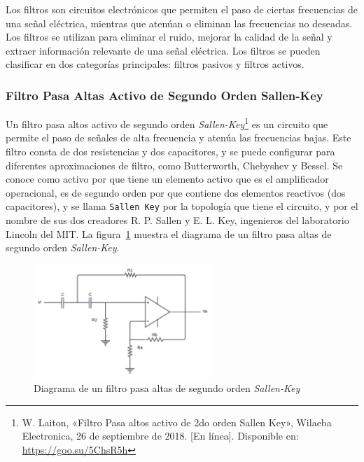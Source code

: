         Los filtros son circuitos electrónicos que permiten el paso de ciertas frecuencias de una señal eléctrica, mientras que atenúan o eliminan las frecuencias no deseadas. Los filtros se utilizan para eliminar el ruido, mejorar la calidad de la señal y extraer información relevante de una señal eléctrica. Los filtros se pueden clasificar en dos categorías principales: filtros pasivos y filtros activos.

        \subsubsection{Filtro Pasa Altas Activo de Segundo Orden Sallen-Key}

            Un filtro pasa altos activo de segundo orden \textit{Sallen-Key}\footnote{W. Laiton, «Filtro Pasa altos activo de 2do orden Sallen Key», Wilaeba Electronica, 26 de septiembre de 2018. [En línea]. Disponible en: \url{https://goo.su/5ChsR5h}} es un circuito que permite el paso de señales de alta frecuencia y atenúa las frecuencias bajas. Este filtro consta de dos resistencias y dos capacitores, y se puede configurar para diferentes aproximaciones de filtro, como Butterworth, Chebyshev y Bessel. Se conoce como activo por que tiene un elemento activo que es el amplificador operacional, es de segundo orden por que contiene dos elementos reactivos (dos capacitores), y se llama \texttt{Sallen Key} por la topología que tiene el circuito, y por el nombre de sus dos creadores R. P. Sallen y E. L. Key, ingenieros del laboratorio Lincoln del MIT. La figura~\ref{fig:Filtro_Pasa_Altas} muestra el diagrama de un filtro pasa altas de segundo orden \textit{Sallen-Key}.

            \begin{figure}[H]
                \centering
                \includegraphics[width=0.6\textwidth]{img/Marco/Filtro_Pasa_Altas.png}
                \caption[Diagrama de un filtro pasa altas de segundo orden \textit{Sallen-Key}.]{Diagrama de un filtro pasa altas de segundo orden \textit{Sallen-Key}}
                \label{fig:Filtro_Pasa_Altas}
            \end{figure}


